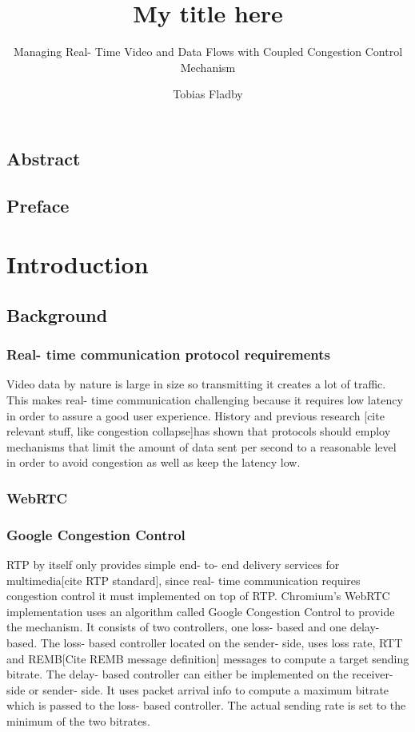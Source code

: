 \documentclass[UKenglish]{ifimaster}  %
\title{My title here}        %
\subtitle{Managing Real- Time Video and Data Flows with Coupled Congestion Control Mechanism}         %
\author{Tobias Fladby}                      %
\begin{document}
\duoforside[dept={Department of Informatics},   %
  program={programming and system architecture},  %
  long]                                        %

\frontmatter{}
\chapter*{Abstract}                   %

\tableofcontents{}
\listoffigures{}
\listoftables{}

\chapter*{Preface}                    %

\mainmatter{}
\part{Introduction}                   %

\chapter{Background}
\section{Real- time communication protocol requirements}
Video data by nature is large in size so transmitting it creates a lot of traffic. 
This makes real- time communication challenging because it requires low latency in order to assure a good user experience. 
History and previous research [cite relevant stuff, like congestion collapse]has shown that protocols should employ mechanisms that limit the amount of data sent per second to a reasonable level in order to avoid congestion as well as keep the latency low.

\section{WebRTC}
\section{Google Congestion Control}
RTP by itself only provides simple end- to- end delivery services for multimedia[cite RTP standard], since real- time communication requires congestion control it must implemented on top of RTP. 
Chromium's WebRTC implementation uses an algorithm called Google Congestion Control \cite{rfc8699} to provide the mechanism.
It consists of two controllers, one loss- based and one delay- based. 
The loss- based controller located on the sender- side, uses loss rate, RTT and REMB[Cite REMB message definition] messages to compute a target sending bitrate. 
The delay- based controller can either be implemented on the receiver- side or sender- side.
It uses packet arrival info to compute a maximum bitrate which is passed to the loss- based controller. The actual sending rate is set to the minimum of the two bitrates.
\end{document}
